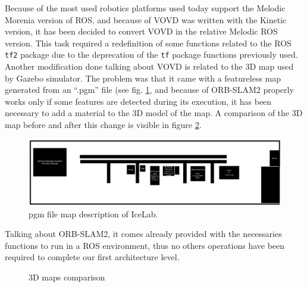 Because of the most used robotics platforms used today support the Melodic Morenia \cite{rosmelodic} version of ROS, and because of VOVD was written with the Kinetic version, it has been decided to convert VOVD in the relative Melodic ROS version. This task required a redefinition of some functions related to the ROS \texttt{tf2} package \cite{tfros} due to the deprecation of the \texttt{tf} package functions previously used. 
Another modification done talking about VOVD is related to the 3D map used by Gazebo \cite{Gazebo} simulator. The problem was that it came with a featureless map generated from an ``.pgm'' file (see fig. \ref{fig:mapfile}, and because of ORB-SLAM2 properly works only if some features are detected during its execution, it has been necessary to add a material to the 3D model of the map. A comparison of the 3D map before and after this change is visible in figure \ref{fig:3Dmapcomparison}.

\begin{figure}[htbp]
	\centering
	\includegraphics[width=\textwidth]{images/icelabmap}
	\caption{pgm file map description of IceLab.}
	\label{fig:mapfile}
\end{figure}

Talking about ORB-SLAM2, it comes already provided with the necessaries functions to run in a ROS environment, thus no others operations have been required to complete our first architecture level.
	

\begin{figure}
	\centering
	\hfil
	\caption{3D maps comparison}
	\label{fig:3Dmapcomparison}
\end{figure}


